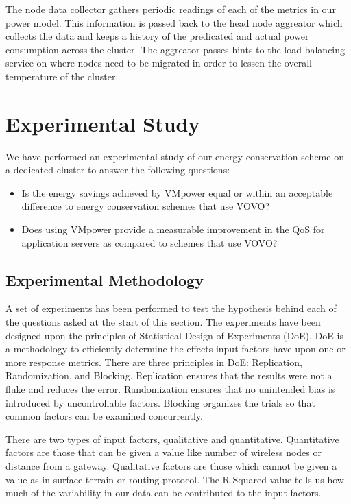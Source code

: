 \documentclass[times, 10pt,twocolumn]{article}
\begin{document}
The node data collector gathers periodic readings of each of the metrics in
our power model. This information is passed back to the head node aggreator
which collects the data and keeps a history of the predicated and actual power
consumption across the cluster.  The aggreator passes hints to the load
balancing service on where nodes need to be migrated in order to lessen the
overall temperature of the cluster.


\section{Experimental Study}
\label{sec:experiment}
We have performed an experimental study of our energy conservation scheme on a
dedicated cluster to answer the following questions:
\begin{itemize}
\item Is the energy savings achieved by  VMpower equal or within an
  acceptable difference to energy conservation schemes that use VOVO?
\item Does using VMpower provide a measurable improvement in the QoS for
  application servers as compared to schemes that use VOVO?
\end{itemize}

\subsection{Experimental Methodology}
\label{sec:Method}
A set of experiments has been performed to test the hypothesis behind each of
the questions asked at the start of this section.  The experiments have been
designed upon the principles of Statistical Design of Experiments (DoE).
DoE \cite{Montgomery2005} is a methodology to efficiently determine the effects
input factors have upon one or more response metrics.  There are three
principles in DoE: Replication, Randomization, and Blocking.  Replication
ensures that the results were not a fluke and reduces the error.
Randomization ensures that no unintended bias is introduced by uncontrollable
factors.  Blocking organizes the trials so that common factors can be examined
concurrently.

There are two types of input factors, qualitative and quantitative.
Quantitative factors are those that can be given a value like number of
wireless nodes or distance from a gateway.  Qualitative factors are those
which cannot be given a value as in surface terrain or routing protocol.  The
R-Squared value tells us how much of the variability in our data can be
contributed to the input factors.
\end{document}
